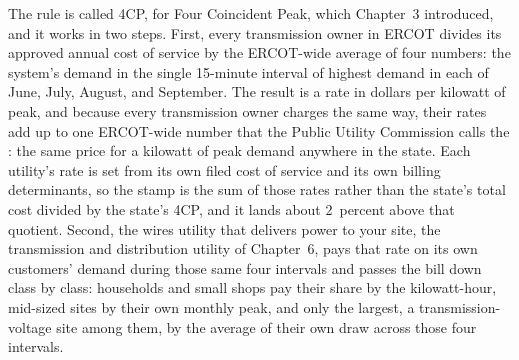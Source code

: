 The rule is called 4CP, for Four Coincident Peak, which Chapter~3 introduced, and it works in two steps. %
First, every transmission owner in ERCOT divides its approved annual cost of service by the ERCOT-wide average of four numbers: the system's demand in the single 15-minute interval of highest demand in each of June, July, August, and September. %
The result is a rate in dollars per kilowatt of peak, and because every transmission owner charges the same way, their rates add up to one ERCOT-wide number that the Public Utility Commission calls the : the same price for a kilowatt of peak demand anywhere in the state. Each utility's rate is set from its own filed cost of service and its own billing determinants, so the stamp is the sum of those rates rather than the state's total cost divided by the state's 4CP, and it lands about 2~percent above that quotient. %
Second, the wires utility that delivers power to your site, the transmission and distribution utility of Chapter~6, pays that rate on its own customers' demand during those same four intervals and passes the bill down class by class: households and small shops pay their share by the kilowatt-hour, mid-sized sites by their own monthly peak, and only the largest, a transmission-voltage site among them, by the average of their own draw across those four intervals. %
